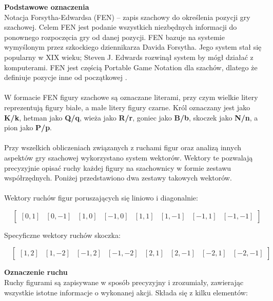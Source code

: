 \documentclass[twoside]{projektInzynierskiMS1}
\begin{document}
\noindent \textbf{Podstawowe oznaczenia}\\
Notacja Forsytha-Edwardsa (FEN) – zapis szachowy do określenia pozycji gry szachowej. Celem FEN jest podanie wszystkich niezbędnych informacji do ponownego rozpoczęcia gry od danej pozycji. FEN bazuje na systemie wymyślonym przez szkockiego dziennikarza Davida Forsytha. Jego system stał się popularny w XIX wieku; Steven J. Edwards rozwinął system by mógł działać z komputerami. FEN jest częścią Portable Game Notation dla szachów, dlatego że definiuje pozycje inne od początkowej \cite{WikiNotacjaForsytha}.
\\\\
W formacie FEN figury szachowe są oznaczane literami, przy czym wielkie litery reprezentują figury białe, a małe litery figury czarne. Król oznaczany jest jako \textbf{K/k}, hetman jako \textbf{Q/q}, wieża jako \textbf{R/r}, goniec jako \textbf{B/b}, skoczek jako \textbf{N/n}, a pion jako \textbf{P/p}.
\\\\
Przy wszelkich obliczeniach związanych z ruchami figur oraz analizą innych aspektów gry szachowej wykorzystano system wektorów. Wektory te pozwalają precyzyjnie opisać ruchy każdej figury na szachownicy w formie zestawu współrzędnych. Poniżej przedstawiono dwa zestawy takowych wektorów.
\\\\
Wektory ruchów figur poruszających się liniowo i diagonalnie:

\[ \quad 
\begin{bmatrix}
    [0, 1] & [0, -1] & [1, 0] & [-1, 0] & [1, 1] & [1, -1] & [-1, 1] & [-1, -1]
\end{bmatrix}
\]

\noindent
Specyficzne wektory ruchów skoczka:

\[ \quad 
\begin{bmatrix}
    [1, 2] & [1, -2] & [-1, 2] & [-1, -2] & [2, 1] & [2, -1] & [-2, 1] & [-2, -1]
\end{bmatrix}
\]

\newpage

\noindent \textbf{Oznaczenie ruchu}\\
Ruchy figurami są zapisywane w sposób precyzyjny i zrozumiały, zawierając wszystkie istotne informacje o wykonanej akcji. Składa się z kilku elementów:
\end{document}

